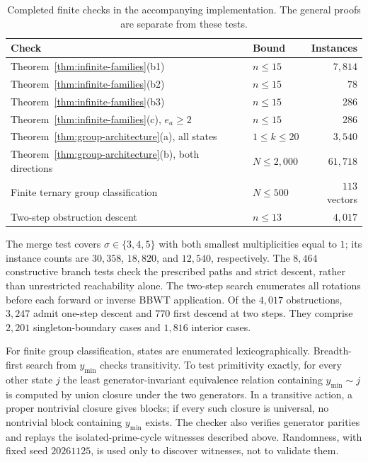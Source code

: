 \documentclass[11pt,a4paper]{article}
\theoremstyle{definition}
\begin{document}
\begin{table}[t]
\centering\small
\caption{Completed finite checks in the accompanying implementation. The general proofs are separate from these tests.}
\label{tab:bounded-checks}
\begin{tabular}{@{}p{.55\linewidth}p{.20\linewidth}r@{}}
\toprule
Check & Bound & Instances \\
\midrule
Theorem~\ref{thm:infinite-families}(b1) & $n\le15$ & $7{,}814$ \\
Theorem~\ref{thm:infinite-families}(b2) & $n\le15$ & $78$ \\
Theorem~\ref{thm:infinite-families}(b3) & $n\le15$ & $286$ \\
Theorem~\ref{thm:infinite-families}(c), $e_a\ge2$ & $n\le15$ & $286$ \\
Theorem~\ref{thm:group-architecture}(a), all states & $1\le k\le20$ & $3{,}540$ \\
Theorem~\ref{thm:group-architecture}(b), both directions & $N\le2{,}000$ & $61{,}718$ \\
Finite ternary group classification & $N\le500$ & $113$ vectors \\
Two-step obstruction descent & $n\le13$ & $4{,}017$ \\
\bottomrule
\end{tabular}
\end{table}

The merge test covers $\sigma\in\{3,4,5\}$ with both smallest multiplicities equal to $1$; its instance counts are $30{,}358$, $18{,}820$, and $12{,}540$, respectively. The $8{,}464$ constructive branch tests check the prescribed paths and strict descent, rather than unrestricted reachability alone. The two-step search enumerates all rotations before each forward or inverse BBWT application. Of the $4{,}017$ obstructions, $3{,}247$ admit one-step descent and $770$ first descend at two steps. They comprise $2{,}201$ singleton-boundary cases and $1{,}816$ interior cases.

For finite group classification, states are enumerated lexicographically. Breadth-first search from $y_{\min}$ checks transitivity. To test primitivity exactly, for every other state $j$ the least generator-invariant equivalence relation containing $y_{\min}\sim j$ is computed by union closure under the two generators. In a transitive action, a proper nontrivial closure gives blocks; if every such closure is universal, no nontrivial block containing $y_{\min}$ exists. The checker also verifies generator parities and replays the isolated-prime-cycle witnesses described above. Randomness, with fixed seed $20261125$, is used only to discover witnesses, not to validate them.
\end{document}
